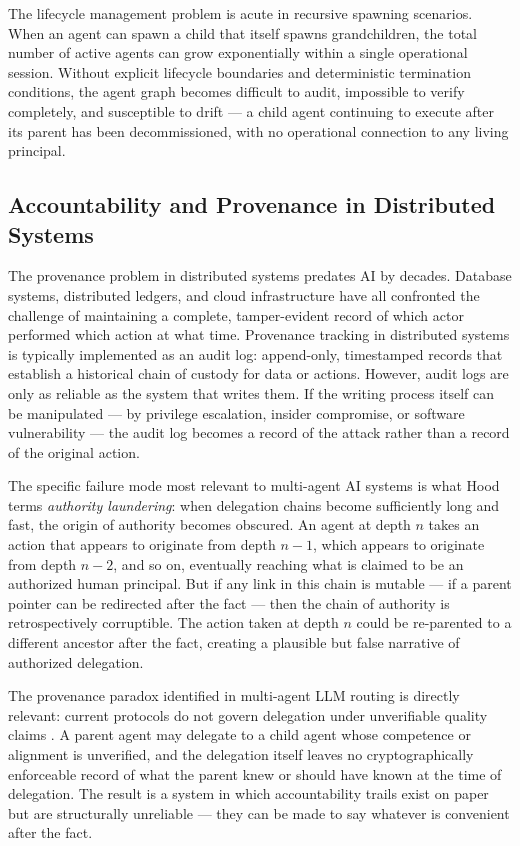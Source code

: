 The lifecycle management problem is acute in recursive spawning scenarios. When an agent can spawn a child that itself spawns grandchildren, the total number of active agents can grow exponentially within a single operational session. Without explicit lifecycle boundaries and deterministic termination conditions, the agent graph becomes difficult to audit, impossible to verify completely, and susceptible to drift — a child agent continuing to execute after its parent has been decommissioned, with no operational connection to any living principal.

\subsection{Accountability and Provenance in Distributed Systems}
\label{sec:accountability-provenance}

The provenance problem in distributed systems predates AI by decades. Database systems, distributed ledgers, and cloud infrastructure have all confronted the challenge of maintaining a complete, tamper-evident record of which actor performed which action at what time. Provenance tracking in distributed systems is typically implemented as an audit log: append-only, timestamped records that establish a historical chain of custody for data or actions. However, audit logs are only as reliable as the system that writes them. If the writing process itself can be manipulated — by privilege escalation, insider compromise, or software vulnerability — the audit log becomes a record of the attack rather than a record of the original action.

The specific failure mode most relevant to multi-agent AI systems is what Hood \cite{hood2025} terms \emph{authority laundering}: when delegation chains become sufficiently long and fast, the origin of authority becomes obscured. An agent at depth $n$ takes an action that appears to originate from depth $n-1$, which appears to originate from depth $n-2$, and so on, eventually reaching what is claimed to be an authorized human principal. But if any link in this chain is mutable — if a parent pointer can be redirected after the fact — then the chain of authority is retrospectively corruptible. The action taken at depth $n$ could be re-parented to a different ancestor after the fact, creating a plausible but false narrative of authorized delegation.

The provenance paradox identified in multi-agent LLM routing is directly relevant: current protocols do not govern delegation under unverifiable quality claims \cite{provenance2025}. A parent agent may delegate to a child agent whose competence or alignment is unverified, and the delegation itself leaves no cryptographically enforceable record of what the parent knew or should have known at the time of delegation. The result is a system in which accountability trails exist on paper but are structurally unreliable — they can be made to say whatever is convenient after the fact.

